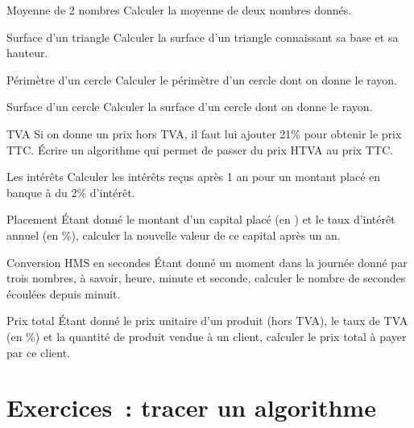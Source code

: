 \begin{Exercice}{Moyenne de 2 nombres}	
	Calculer la moyenne de deux nombres donnés.
\end{Exercice}

\begin{Exercice}{Surface d’un triangle}
	Calculer la surface d’un triangle 
	connaissant sa base et sa hauteur.
\end{Exercice}

\begin{Exercice}{Périmètre d’un cercle}
	Calculer le périmètre d’un cercle dont on donne le rayon. 
\end{Exercice}

\begin{Exercice}{Surface d’un cercle}
	Calculer la surface d’un cercle dont on donne le rayon. 
\end{Exercice}

\begin{Exercice}{TVA}
	Si on donne un prix hors TVA, il faut lui ajouter 21\% 
	pour obtenir le prix TTC. Écrire un algorithme qui permet 
	de passer du prix HTVA au prix TTC.
\end{Exercice}

\begin{Exercice}{Les intérêts}	
	Calculer les intérêts reçus après 1 an 
	pour un montant placé en banque à du 2\% d’intérêt.
\end{Exercice}

\begin{Exercice}{Placement}
	Étant donné le montant d’un capital placé (en \texteuro) 
	et le taux d’intérêt annuel (en \%), calculer la
	nouvelle valeur de ce capital après un an.
\end{Exercice}

\begin{Exercice}{Conversion HMS en secondes}
	Étant donné un moment dans la journée donné
	par trois nombres, à savoir, heure, minute et seconde, calculer le
	nombre de secondes écoulées depuis minuit.
\end{Exercice}

\begin{Exercice}{Prix total}
	Étant donné le prix unitaire d’un produit
	(hors TVA), le taux de TVA (en \%) 
	et la quantité de produit vendue à un client, 
	calculer le prix total à payer par ce client.
\end{Exercice}


\clearpage
\section{Exercices~: tracer un algorithme}

